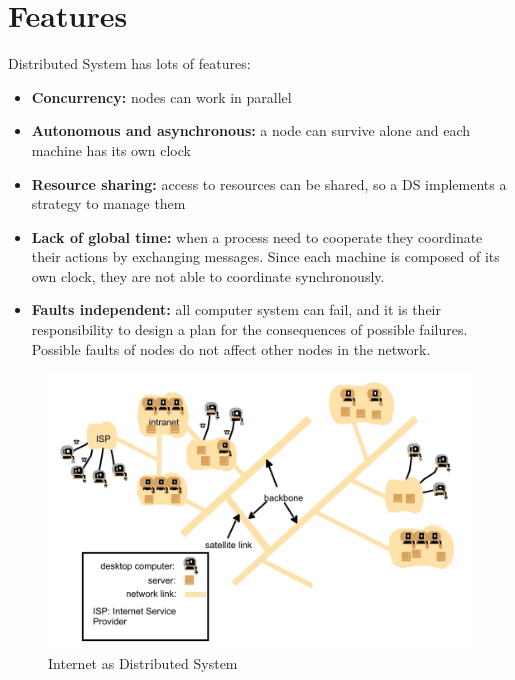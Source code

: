 \section{Features}
Distributed System has lots of features:
\begin{itemize}
    \item \textbf{Concurrency:} nodes can work in parallel
    \item \textbf{Autonomous and asynchronous:} a node can survive alone and each machine has its own clock
    \item \textbf{Resource sharing:} access to resources can be shared, so a DS implements a strategy to manage them
    \item \textbf{Lack of global time:} when a process need to cooperate they coordinate their actions by exchanging messages. Since each machine is composed of its own clock, they are not able to coordinate synchronously.
    \item \textbf{Faults independent:} all computer system can fail, and it is their responsibility to design a plan for the consequences of possible failures. Possible faults of nodes do not affect other nodes in the network.
\end{itemize}
\begin{figure}
    \centering
    \includegraphics[width=.7\linewidth]{images/introduction/InternetAsDistributedSystem.jpeg}
    \caption{Internet as Distributed System}
\end{figure}

